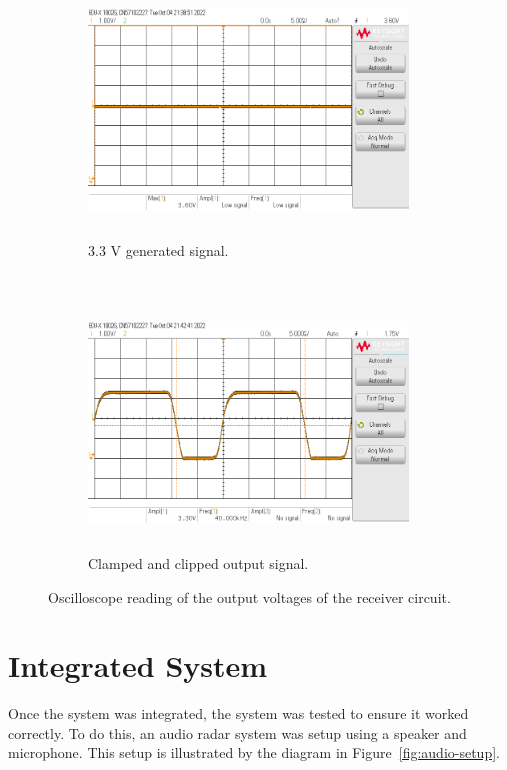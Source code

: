 \documentclass[class=report,11pt,crop=false]{standalone}
\begin{document}
\begin{figure}[htbp]
    \centering
    \captionsetup{type=figure}
    \begin{subfigure}[t]{0.5\textwidth}
        \centering
        \def\svgwidth{1\linewidth}
        {\scriptsize
            \includegraphics[width=8.5cm,height=6cm]{../Images/scope_14.png}}
        \caption{3.3 V generated signal.}
        \label{fig:osc-receiver-3-3}
    \end{subfigure}%
    ~ 
    \begin{subfigure}[t]{0.5\textwidth}
        \def\svgwidth{1\linewidth}
        {\scriptsize
            \includegraphics[width=8.5cm,height=6cm]{../Images/scope_17.png}}
        \caption{Clamped and clipped output signal.}
        \label{fig:osc-receiver-clamp-clip}
    \end{subfigure}
    \caption{Oscilloscope reading of the output voltages of the receiver circuit.}
    \label{fig:osc-receiver-3}
\end{figure}


\section{Integrated System}
Once the system was integrated, the system was tested to ensure it worked correctly. To do this, an audio radar system was setup using a speaker and microphone. This setup is illustrated by the diagram in Figure~\ref{fig:audio-setup}.
\end{document}
